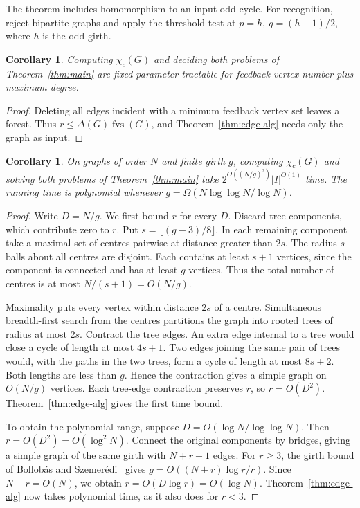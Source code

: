 \documentclass[11pt]{article}
\newtheorem{corollary}[theorem]{Corollary}
\theoremstyle{remark}
\DeclareMathOperator{\fvs}{fvs}
\begin{document}
The theorem includes homomorphism to an input odd cycle. For recognition,
reject bipartite graphs and apply the threshold test at
$p=h,\ q=(h-1)/2$, where $h$ is the odd girth.

\begin{corollary}\label{cor:degree}
Computing $\chi_c(G)$ and deciding both problems of Theorem~\ref{thm:main}
are fixed-parameter tractable for feedback vertex number plus maximum degree.
\end{corollary}
\begin{proof}
Deleting all edges incident with a minimum feedback vertex set leaves a
forest. Thus $r\leq\Delta(G)\fvs(G)$, and Theorem~\ref{thm:edge-alg}
needs only the graph as input.
\end{proof}

\begin{corollary}\label{cor:relative-girth}
On graphs of order $N$ and finite girth $g$, computing $\chi_c(G)$ and
solving both problems of Theorem~\ref{thm:main} take
$2^{O((N/g)^2)}|I|^{O(1)}$ time. The running time is polynomial whenever
$g=\Omega(N\log\log N/\log N)$.
\end{corollary}
\begin{proof}
Write $D=N/g$. We first bound $r$ for every $D$.
Discard tree components, which contribute zero to $r$. Put
$s=\lfloor(g-3)/8\rfloor$. In each remaining component take a maximal
set of centres pairwise at distance greater than $2s$. The radius-$s$
balls about all centres are disjoint. Each contains at least $s+1$
vertices, since the component is connected and has at least $g$ vertices.
Thus the total number of centres is at most $N/(s+1)=O(N/g)$.

Maximality puts every vertex within distance $2s$ of a centre.
Simultaneous breadth-first search from the centres partitions the graph
into rooted trees of radius at most $2s$. Contract the tree edges.
An extra edge internal to a tree would close a cycle of length at most
$4s+1$. Two edges joining the same pair of trees would, with the paths
in the two trees, form a cycle of length at most $8s+2$. Both lengths
are less than $g$. Hence the contraction gives a simple graph on
$O(N/g)$ vertices. Each tree-edge contraction preserves $r$, so
$r=O(D^2)$. Theorem~\ref{thm:edge-alg} gives the first time bound.

To obtain the polynomial range, suppose $D=O(\log N/\log\log N)$.
Then $r=O(D^2)=O(\log^2 N)$. Connect the original components by bridges,
giving a simple graph of the same girth with $N+r-1$ edges. For $r\geq3$,
the girth bound of Bollob\'as and Szemer\'edi~\cite{bs2002} gives
$g=O((N+r)\log r/r)$. Since $N+r=O(N)$, we obtain
$r=O(D\log r)=O(\log N)$. Theorem~\ref{thm:edge-alg} now takes polynomial
time, as it also does for $r<3$.
\end{proof}
\end{document}
